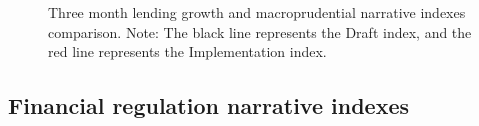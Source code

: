 \documentclass[
  letterpaper,
  DIV=11,
  numbers=noendperiod]{scrartcl}
\begin{document}
\begin{figure}[H]


\caption{\label{fig-macro_narrative_indexes_three_month}Three month
lending growth and macroprudential narrative indexes comparison. Note:
The black line represents the Draft index, and the red line represents
the Implementation index.}

\end{figure}%

\newpage

\subsection{Financial regulation narrative
indexes}\label{financial-regulation-narrative-indexes}
\end{document}
